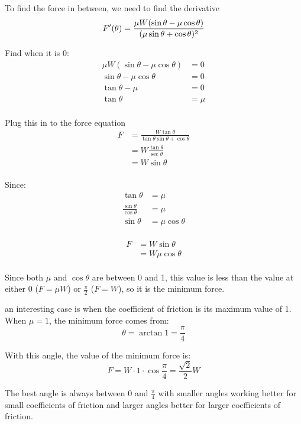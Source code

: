 \documentclass[letterpaper, landscape]{exam}
\begin{document}
\begin{description}
      To find the force in between, we need to find the derivative
      \[
        F'(\theta) = \frac{\mu  W (\sin \theta - \mu \cos \theta)}
                          {(\mu \sin \theta + \cos \theta)^2} \\
      \]

      Find when it is 0:
      \begin{align*}
        \mu  W (\sin \theta - \mu \cos \theta) & = 0 \\
        \sin \theta - \mu \cos \theta          & = 0 \\
        \tan \theta - \mu                      & = 0 \\
        \tan \theta                            & = \mu \\
      \end{align*}

      Plug this in to the force equation
      \begin{align*}
        F & = \frac{W \tan \theta}{\tan \theta \sin \theta + \cos \theta} \\
          & = W \frac{\tan \theta}{\sec \theta} \\
          & = W \sin \theta \\
      \end{align*}

      Since:
      \begin{align*}
        \tan \theta                     & = \mu \\
        \frac{\sin \theta}{\cos \theta} & = \mu \\
        \sin \theta                     & = \mu \cos \theta \\
      \end{align*}
      
      \begin{align*}
        F & = W \sin \theta \\
          & = W \mu \cos \theta \\
      \end{align*}

      Since both $\mu$ and $\cos \theta$ are between 0 and 1, this value is less than the value at
      either $0$ ($F = \mu W$) or $\frac{\pi}{2}$ ($F = W$), so it is the minimum force.

      an interesting case is when the coefficient of friction is its maximum value of 1. When $\mu =
      1$, the minimum force comes from:
      \[
        \theta = \arctan 1 = \frac{\pi}{4}
      \]
      
      With this angle, the value of the minimum force is:
      \[
        F = W \cdot 1 \cdot \cos \frac{\pi}{4} = \frac{\sqrt{2}}{2} W
      \]

      The best angle is always between $0$ and $\frac{\pi}{4}$ with smaller angles working better
      for small coefficients of friction and larger angles better for larger coefficients of
      friction.

  \end{description}
\end{document}
